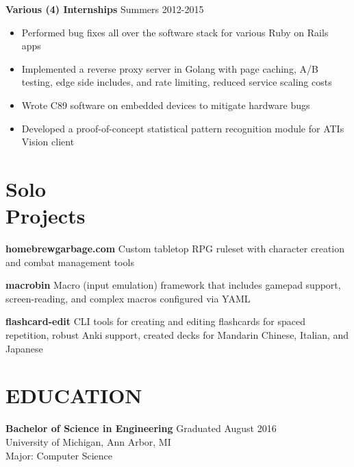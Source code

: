 \documentclass[line,margin]{res}
\begin{document}
\begin{resume}
                

        {\sc \textbf{Various (4) Internships}} \hfill Summers 2012-2015
                 \begin{itemize}  \itemsep -2pt %
                 \item Performed bug fixes all over the software stack for various Ruby on Rails apps

                 \item Implemented a reverse proxy server in Golang with page caching, A/B testing, edge side includes, and rate limiting, reduced service scaling costs

                 \item Wrote C89 software on embedded devices to mitigate hardware bugs

                 \item Developed a proof-of-concept statistical pattern recognition module for ATI\textquotesingle s Vision client
                 \end{itemize}

\section{\textcolor{HeaderColor}{Solo \\ Projects}}
    {\sc \textbf{homebrewgarbage.com}}
    Custom tabletop RPG ruleset with character creation and combat management tools

    {\sc \textbf{macrobin}}
    Macro (input emulation) framework that includes gamepad support, screen-reading, and complex macros configured via YAML
    
    {\sc \textbf{flashcard-edit}}
    CLI tools for creating and editing flashcards for spaced repetition, robust Anki support, created decks for Mandarin Chinese, Italian, and Japanese




\section{\textcolor{HeaderColor}{EDUCATION}} {\sc \textbf{Bachelor of Science in Engineering}} \hfill Graduated August 2016\\
                 University of Michigan, Ann Arbor, MI \\
                 Major: Computer Science

\end{resume}
\end{document}
